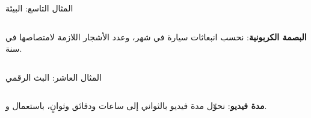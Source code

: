 \begin{frame}[t]{المثال التاسع: البيئة}
    \begin{columns}[T]
        {\small\textbf{البصمة الكربونية}: نحسب انبعاثات سيارة في شهر، وعدد الأشجار اللازمة لامتصاصها في سنة.\par}
        \vspace{0.3cm}
    \end{columns}
\end{frame}

\begin{frame}[t]{المثال العاشر: البث الرقمي}
    \begin{columns}[T]
        {\small\textbf{مدة فيديو}: نحوّل مدة فيديو بالثواني إلى ساعات ودقائق وثوانٍ، باستعمال \code{/} و\code{\%}.\par}
        \vspace{0.3cm}
    \end{columns}
\end{frame}
